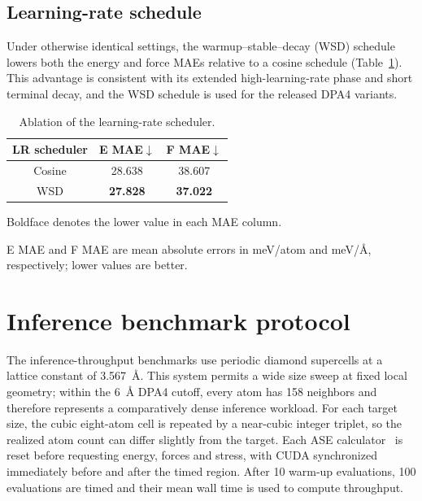 \FloatBarrier
\subsection{Learning-rate schedule}

Under otherwise identical settings, the warmup--stable--decay (WSD) schedule lowers both the energy and force MAEs relative to a cosine schedule (Table~\ref{tab:sm_training_recipe}).
This advantage is consistent with its extended high-learning-rate phase and short terminal decay, and the WSD schedule is used for the released DPA4 variants.

\begin{table}[ht]
    \PaperTableStyle
    \begin{threeparttable}
        \caption{Ablation of the learning-rate scheduler.}
        \label{tab:sm_training_recipe}
        \begin{tabular*}{\linewidth}{@{\extracolsep{\fill}}ccc@{}}
        \toprule
        \textbf{LR scheduler}          &
        \textbf{E MAE}$\downarrow$\tnote{a} &
        \textbf{F MAE}$\downarrow$\tnote{a}                                             \\
        \midrule
        Cosine                          & 28.638          & 38.607          \\
        WSD                             & \textbf{27.828} & \textbf{37.022} \\
        \bottomrule
        \end{tabular*}
        \begin{tablenotes}[flushleft]
            \PaperTableNotesStyle
            \item[] Boldface denotes the lower value in each MAE column.
            \item[a] E MAE and F MAE are mean absolute errors in meV/atom and meV/\AA, respectively; lower values are better.
        \end{tablenotes}
    \end{threeparttable}
\end{table}

\FloatBarrier
\section{Inference benchmark protocol}
\label{sec:sm-inference}

The inference-throughput benchmarks use periodic diamond supercells at a lattice constant of 3.567~\AA{}.
This system permits a wide size sweep at fixed local geometry; within the 6~\AA{} DPA4 cutoff, every atom has 158 neighbors and therefore represents a comparatively dense inference workload.
For each target size, the cubic eight-atom cell is repeated by a near-cubic integer triplet, so the realized atom count can differ slightly from the target.
Each ASE calculator~\cite{ase-paper} is reset before requesting energy, forces and stress, with CUDA synchronized immediately before and after the timed region.
After 10 warm-up evaluations, 100 evaluations are timed and their mean wall time is used to compute throughput.

